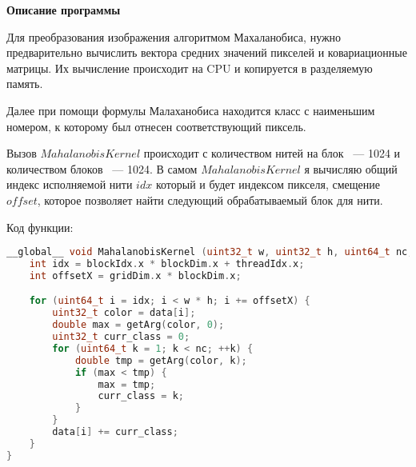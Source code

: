 \textbf{\large Описание программы}

Для преобразования изображения алгоритмом Махаланобиса, нужно предварительно вычислить вектора средних значений пикселей и ковариационные матрицы. Их вычисление происходит на CPU и копируется в разделяемую память.

Далее при помощи формулы Малаханобиса находится класс с наименьшим номером, к которому был отнесен соответствующий пиксель.

Вызов $MahalanobisKernel$ происходит с количеством нитей на блок ~--- 1024 и количеством блоков ~--- 1024.
В самом $MahalanobisKernel$ я вычисляю общий индекс исполняемой нити $idx$ который и будет индексом пикселя, смещение $offset$, которое позволяет найти следующий обрабатываемый блок для нити.

Код функции:

\begin{lstlisting}[basicstyle=\normalfont, language=C++]
__global__ void MahalanobisKernel (uint32_t w, uint32_t h, uint64_t nc, uint32_t *data) {
    int idx = blockIdx.x * blockDim.x + threadIdx.x;
    int offsetX = gridDim.x * blockDim.x;

    for (uint64_t i = idx; i < w * h; i += offsetX) {
        uint32_t color = data[i];
        double max = getArg(color, 0);
        uint32_t curr_class = 0;
        for (uint64_t k = 1; k < nc; ++k) {
            double tmp = getArg(color, k);
            if (max < tmp) {
                max = tmp;
                curr_class = k;
            }
        }
        data[i] += curr_class;
    }
}
\end{lstlisting}

\vspace{15pt}

